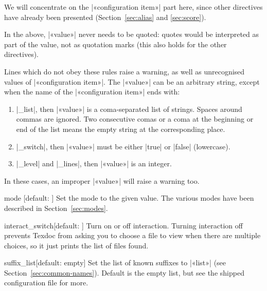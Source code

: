 \documentclass{texdoc-doc}
\begin{document}
We will concentrate on the |«configuration item»| part here, since other
directives have already been presented (Section~\ref{sec:alias} and
\ref{sec:score}).

In the above, |«value»|  never needs to be quoted: quotes would be interpreted
as part of the value, not as quotation marks (this also holds for the other
directives).

Lines which do not obey these rules raise a warning, as well as unrecognised
values of |«configuration item»|. The |«value»| can be an arbitrary string,
except when the name of the |«configuration item»| ends with:
%
\begin{enumerate}
\item |_list|, then |«value»| is a coma-separated list of strings. Spaces
  around commas are ignored. Two consecutive comas or a coma at the beginning
  or end of the list means the empty string at the corresponding place.
\item |_switch|, then |«value»| must be either |true| or |false|
  (lowercase).
\item |_level| and |_lines|, then |«value»| is an integer.
\end{enumerate}
%
In these cases, an improper |«value»| will raise a warning too.

\begin{confitem}{mode}
  {}[default: ]
Set the  mode to the given value. The various modes have been described
in Section~\ref{sec:modes}.
\end{confitem}

\begin{confitem}{interact\_switch}{}[default: ]
Turn on or off interaction. Turning interaction off prevents Texdoc from asking
you to choose a file to view when there are multiple choices, so it just prints
the list of files found.
\end{confitem}

\begin{confitem}{suffix\_list}{}[default: empty]
Set the list of known suffixes to |«list»| (see
Section~\ref{sec:common-names}). Default is the empty list, but see the
shipped configuration file for more.
\end{confitem}
\end{document}
